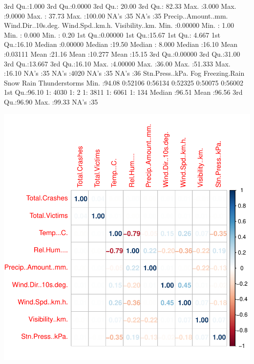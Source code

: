 \documentclass[11pt, a4paper]{article}
\begin{document}
\begin{Schunk}
\begin{Soutput}
 3rd Qu.:1.000   3rd Qu.:0.0000   3rd Qu.: 20.00   3rd Qu.: 82.33  
 Max.   :3.000   Max.   :9.0000   Max.   : 37.73   Max.   :100.00  
                                  NA's   :35       NA's   :35      
 Precip..Amount..mm. Wind.Dir..10s.deg. Wind.Spd..km.h.  Visibility..km.
 Min.   :0.00000     Min.   : 1.00      Min.   : 0.000   Min.   : 0.20  
 1st Qu.:0.00000     1st Qu.:15.67      1st Qu.: 4.667   1st Qu.:16.10  
 Median :0.00000     Median :19.50      Median : 8.000   Median :16.10  
 Mean   :0.03111     Mean   :21.16      Mean   :10.277   Mean   :15.15  
 3rd Qu.:0.00000     3rd Qu.:31.00      3rd Qu.:13.667   3rd Qu.:16.10  
 Max.   :4.00000     Max.   :36.00      Max.   :51.333   Max.   :16.10  
 NA's   :35          NA's   :4020       NA's   :35       NA's   :36     
 Stn.Press..kPa. Fog       Freezing.Rain Snow      Rain      Thunderstorms
 Min.   :94.08   0:52106   0:56134       0:52325   0:50075   0:56002      
 1st Qu.:96.10   1: 4030   1:    2       1: 3811   1: 6061   1:  134      
 Median :96.51                                                            
 Mean   :96.56                                                            
 3rd Qu.:96.90                                                            
 Max.   :99.33                                                            
 NA's   :35                                                               
\end{Soutput}
\end{Schunk}
\includegraphics{variableinvestigation-ss}
\end{document}
